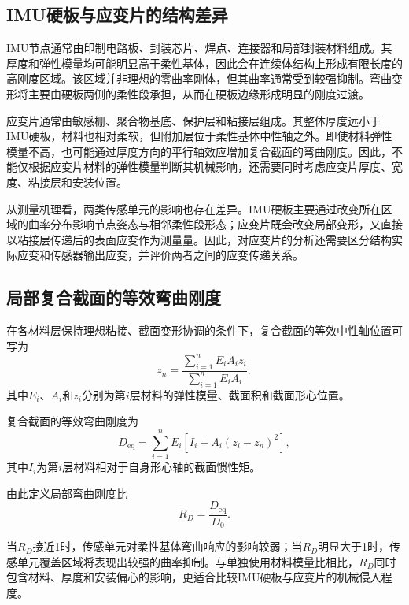 \subsection{IMU硬板与应变片的结构差异}

IMU节点通常由印制电路板、封装芯片、焊点、连接器和局部封装材料组成。其厚度和弹性模量均可能明显高于柔性基体，因此会在连续体结构上形成有限长度的高刚度区域。该区域并非理想的零曲率刚体，但其曲率通常受到较强抑制。弯曲变形将主要由硬板两侧的柔性段承担，从而在硬板边缘形成明显的刚度过渡。

应变片通常由敏感栅、聚合物基底、保护层和粘接层组成。其整体厚度远小于IMU硬板，材料也相对柔软，但附加层位于柔性基体中性轴之外。即使材料弹性模量不高，也可能通过厚度方向的平行轴效应增加复合截面的弯曲刚度。因此，不能仅根据应变片材料的弹性模量判断其机械影响，还需要同时考虑应变片厚度、宽度、粘接层和安装位置。

从测量机理看，两类传感单元的影响也存在差异。IMU硬板主要通过改变所在区域的曲率分布影响节点姿态与相邻柔性段形态；应变片既会改变局部变形，又直接以粘接层传递后的表面应变作为测量量。因此，对应变片的分析还需要区分结构实际应变和传感器输出应变，并评价两者之间的应变传递关系。


\subsection{局部复合截面的等效弯曲刚度}

在各材料层保持理想粘接、截面变形协调的条件下，复合截面的等效中性轴位置可写为
\begin{equation}
    z_n
    =
    \frac{
    \displaystyle\sum_{i=1}^{n}E_iA_i z_i
    }{
    \displaystyle\sum_{i=1}^{n}E_iA_i
    },
    \label{eq:composite_neutral_axis}
\end{equation}
其中$E_i$、$A_i$和$z_i$分别为第$i$层材料的弹性模量、截面积和截面形心位置。

复合截面的等效弯曲刚度为
\begin{equation}
    D_{\mathrm{eq}}
    =
    \sum_{i=1}^{n}
    E_i
    \left[
    I_i+A_i(z_i-z_n)^2
    \right],
    \label{eq:composite_flexural_rigidity}
\end{equation}
其中$I_i$为第$i$层材料相对于自身形心轴的截面惯性矩。

由此定义局部弯曲刚度比
\begin{equation}
    R_D
    =
    \frac{D_{\mathrm{eq}}}{D_0}.
    \label{eq:flexural_rigidity_ratio}
\end{equation}

当$R_D$接近1时，传感单元对柔性基体弯曲响应的影响较弱；当$R_D$明显大于1时，传感单元覆盖区域将表现出较强的曲率抑制。与单独使用材料模量比相比，$R_D$同时包含材料、厚度和安装偏心的影响，更适合比较IMU硬板与应变片的机械侵入程度。

